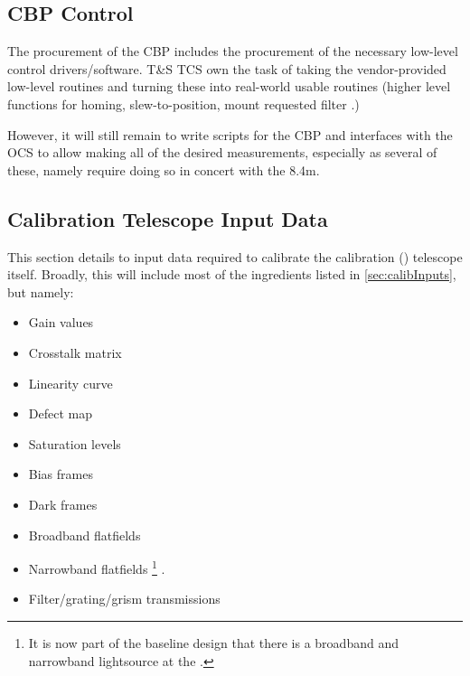 


\subsection{CBP Control}\label{CBP_control}
The procurement of the CBP includes the procurement of the necessary low-level control drivers/software. T\&S TCS own the task of taking the vendor-provided low-level routines and turning these into real-world usable routines (higher level functions for \eg homing, slew-to-position, mount requested filter \etc.)

However, it will still remain to write scripts for the CBP and interfaces with the OCS to allow making all of the desired measurements, especially as several of these, namely \rednote{\xxx, \xxx \& \xxx} require doing so in concert with the 8.4m.




















\subsection{Calibration Telescope Input Data}
\label{sec:calibrationTelescopeDatasets}
This section details to input data required to calibrate the calibration (\auxtelescope) telescope itself. Broadly, this will include most of the ingredients listed in \secsymbol\ref{sec:calibInputs}, but namely:

\begin{itemize}
	\item Gain values
	\item Crosstalk matrix
	\item Linearity curve
	\item Defect map
	\item Saturation levels
	\item Bias frames
	\item Dark frames
	\item Broadband flatfields
	\item Narrowband flatfields \footnote{It is now part of the baseline design that there is a broadband and narrowband lightsource at the \auxtelescope.}  .
	\item Filter/grating/grism transmissions
\end{itemize}

